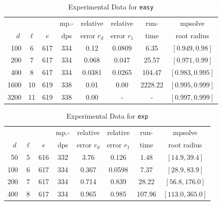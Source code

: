 \documentclass[runningheads]{llncs}
\begin{document}
\begin{table}
\caption{Experimental Data for \texttt{easy}} %
\label{tab:easy}
\vskip -0.15in
\begin{center}
\begin{small}
\begin{sc}
\begin{tabular}{rccccccc}
\toprule
&  &  & mp.-& relative  & relative & run- & mpsolve \\
$d~$& $\ell$& $e$ & dps&error $r_d$       & error $r_1$ &time& root radius\\
\midrule
 100 & 6 & 617 & 334 & 0.12 & 0.0809 & 6.35 & $[0.949, 0.98]$\\
 200 & 7 & 617 & 334 & 0.068 & 0.047 & 25.57 & $[0.971, 0.99]$\\
 400 & 8 & 617 & 334 & 0.0381 & 0.0265 & 104.47 & $[0.983, 0.995]$\\
 1600 &10& 619 & 338 & 0.01 & 0.00 & 2228.22 & $[0.995, 0.999]$\\ %
  3200 &11& 619 & 338 & 0.00 & - & - & $[0.997, 0.999]$\\ %
\bottomrule
\end{tabular}
\end{sc}
\end{small}
\end{center}
\vskip 0.05in
\end{table}


\begin{table}
\caption{Experimental Data for \texttt{exp}} %
\label{tab:exp}
\vskip -0.15in
\begin{center}
\begin{small}
\begin{sc}
\begin{tabular}{rccccccc}
\toprule
&  &  & mp.-& relative  & relative & run- & mpsolve \\
$d~$& $\ell$& $e$ & dps&error $r_d$       & error $r_1$ &time& root radius\\
\midrule
 50 & 5 & 616 & 332 & 3.76 & 0.126 & 1.48 & $[14.9, 39.4]$\\
100 & 6 & 617 & 334 & 0.367 & 0.0598 & 7.37 & $[28.9, 83.9]$\\
 200 & 7 & 617 & 334 & 0.714 & 0.839 & 28.22 & $[56.8, 176.0]$\\
 400 & 8 & 617 & 334 & 0.965 & 0.985 & 107.96 & $[113.0, 365.0]$\\
\bottomrule
\end{tabular}
\end{sc}
\end{small}
\end{center}
\vskip 0.05in
\end{table}
\end{document}
